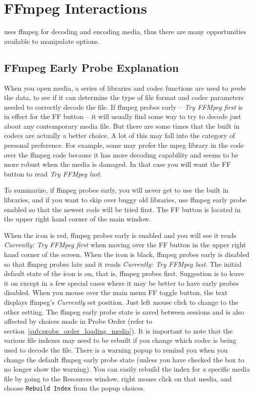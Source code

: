 \chapter{FFmpeg Interactions}%
\label{cha:ffmpeg_interactions}

\CGG{} uses ffmpeg for decoding and encoding media, thus there are many opportunities available to manipulate options.

\section{FFmpeg Early Probe Explanation}%
\label{sec:ffmpeg_early_probe_explanation}

When you open media, a series of libraries and codec functions are used to \textit{probe} the data, to see if it can determine the type of file format and codec parameters needed to correctly decode the file.  If ffmpeg probes early -- \textit{Try FFMpeg first} is in effect for the FF button -- it will usually find some way to try to decode just about any contemporary media file.  But there are some times that the built in codecs are actually a better choice.  A lot of this may fall into the category of personal preference.  For example, some may prefer the mpeg library in the \CGG{} code over the ffmpeg code because it has more decoding capability and seems to be more robust when the media is damaged.  In that case you will want the FF button to read \textit{Try FFMpeg last}.

To summarize, if ffmpeg probes early, you will never get to use the built in libraries, and if you want to skip over buggy old libraries, use ffmpeg early probe enabled so that the newest code will be tried first.
The FF button is located in the upper right hand corner of the main window.

When the icon is red, ffmpeg probes early is enabled and you will see it reads
 \textit{Currently: Try FFMpeg first} when moving over the FF button in the upper 
right hand corner of the screen.  When the icon is black, ffmpeg probes early is disabled so that 
ffmpeg probes late and it reads \textit{Currently: Try FFMpeg last}.  The initial default state of 
the icon is on, that is, ffmpeg probes first. Suggestion is to leave it on except in a few special 
cases where it may be better to have early probes disabled.  When you mouse over the main menu FF 
toggle button, the text displays ffmpeg's \textit{Currently} set position.  Just left mouse click to change to the other setting.
The ffmpeg early probe state is saved between sessions and is also affected by choices made in Probe Order (refer to section~\ref{sub:probe_order_loading_media}). It is important to note that the various file indexes may need to be rebuilt if you change which codec is being used to decode the file.  There is a warning popup to remind you when you change the default ffmpeg early probe state (unless you have checked the box to no longer show the warning).  You can easily rebuild the index for a specific media file by going to the Resources window, right mouse click on that media, and choose \texttt{Rebuild Index} from the popup choices.

